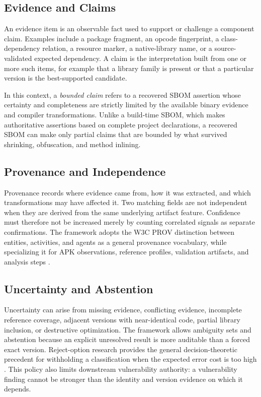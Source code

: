 \subsection{Evidence and Claims}

An evidence item is an observable fact used to support or challenge a
component claim. Examples include a package fragment, an opcode fingerprint, a
class-dependency relation, a resource marker, a native-library name, or a
source-validated expected dependency. A claim is the interpretation built
from one or more such items, for example that a library family is present or
that a particular version is the best-supported candidate.

In this context, a \emph{bounded claim} refers to a recovered SBOM assertion
whose certainty and completeness are strictly limited by the available binary
evidence and compiler transformations. Unlike a build-time SBOM, which makes
authoritative assertions based on complete project declarations, a recovered
SBOM can make only partial claims that are bounded by what survived shrinking,
obfuscation, and method inlining.

\subsection{Provenance and Independence}

Provenance records where evidence came from, how it was extracted, and which
transformations may have affected it. Two matching fields are not independent
when they are derived from the same underlying artifact feature. Confidence
must therefore not be increased merely by counting correlated signals as
separate confirmations. The framework adopts the W3C PROV distinction between
entities, activities, and agents as a general provenance vocabulary, while
specializing it for APK observations, reference profiles, validation
artifacts, and analysis steps \cite{moreau2013prov}.

\subsection{Uncertainty and Abstention}

Uncertainty can arise from missing evidence, conflicting evidence, incomplete
reference coverage, adjacent versions with near-identical code, partial
library inclusion, or destructive optimization. The framework allows
ambiguity sets and abstention because an explicit unresolved result is more
auditable than a forced exact version. Reject-option research provides the
general decision-theoretic precedent for withholding a classification when
the expected error cost is too high \cite{chow1970reject}. This policy also limits downstream
vulnerability authority: a vulnerability finding cannot be stronger than the
identity and version evidence on which it depends.


